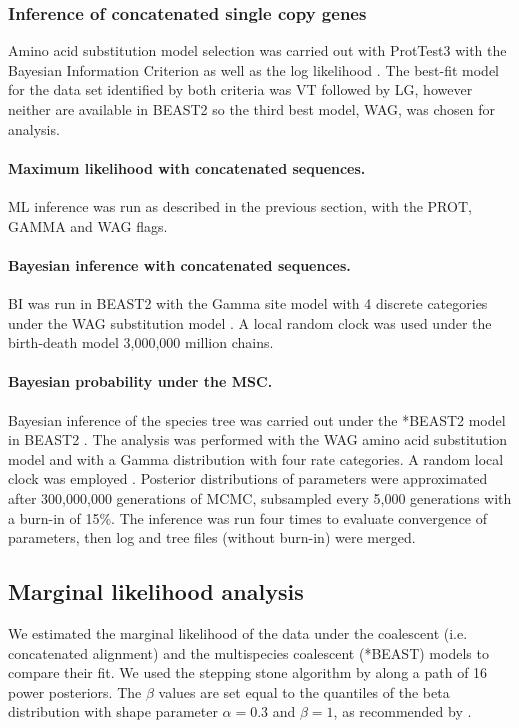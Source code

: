 \documentclass[fleqn,10pt,lineno]{wlpeerj} %
\begin{document}
\subsubsection*{Inference of concatenated single copy genes}
Amino acid substitution model selection was carried out with ProtTest3 with the Bayesian Information Criterion as well as the log likelihood \citep{darriba2011prottest,guindon2003simple}. 
The best-fit model for the data set identified by both criteria was VT followed by LG, however neither are available in BEAST2 so the third best model, WAG, was chosen for analysis. 
\paragraph*{Maximum likelihood with concatenated sequences.}
ML inference was run as described in the previous section, with the PROT, GAMMA and WAG flags.
\paragraph*{Bayesian inference with concatenated sequences.}
BI was run in BEAST2 with the Gamma site model with 4 discrete categories under the WAG substitution model \citep{whelan2001general}. A local random clock was used under the birth-death model 3,000,000 million chains.
\paragraph*{Bayesian probability under the MSC.}
Bayesian inference of the species tree was carried out under the *BEAST2 model in BEAST2 \citep{bouckaert2014beast}. 
The analysis was performed with the WAG amino acid substitution model \citep{whelan2001general} and with a Gamma distribution with four rate categories. 
A random local clock was employed \citep{drummond2010bayesian}. 
Posterior distributions of parameters were approximated after 300,000,000 generations of MCMC, subsampled every 5,000 generations with a burn-in of 15\%. 
The inference was run four times to evaluate convergence of parameters, then log and tree files (without burn-in) were merged. 


\subsection*{Marginal likelihood analysis}
We estimated the marginal likelihood of the data under the coalescent (i.e. concatenated alignment) and the multispecies coalescent (*BEAST) models to compare their fit.
We used the stepping stone algorithm by \cite{xie2011improving} along a path of 16 power posteriors.
The $\beta$ values are set equal to the quantiles of the beta distribution with shape parameter $\alpha=0.3$ and $\beta = 1$, as recommended by \cite{xie2011improving}.
\end{document}
